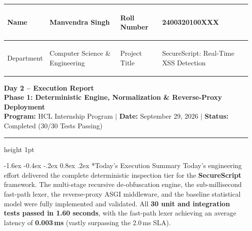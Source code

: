 \documentclass[11pt,a4paper]{article}
\makeatletter
\renewcommand{\section}{\@startsection{section}{1}{\z@}%
  {-1.6ex \@plus -0.4ex \@minus -.2ex}%
  {0.8ex \@plus .2ex}%
  {\normalfont\large\bfseries\color{primaryblue}}}
\makeatother
\begin{document}

\noindent
\begin{tabularx}{\textwidth}{|>{\bfseries\raggedright\arraybackslash}p{2.2cm}|>{\raggedright\arraybackslash}X|>{\bfseries\raggedright\arraybackslash}p{2.3cm}|>{\raggedright\arraybackslash}X|}
\hline
\rowcolor{primaryblue!10}
Name & Manvendra Singh & Roll Number & 2400320100XXX \\
\hline
\rowcolor{primaryblue!5}
Department & Computer Science \& Engineering & Project Title & SecureScript: Real-Time XSS Detection \\
\hline
\end{tabularx}

\vspace{0.8em}

\begin{center}
    {\LARGE \textbf{\color{primaryblue} Day 2 -- Execution Report}} \\[0.25em]
    {\large \textbf{Phase 1: Deterministic Engine, Normalization \& Reverse-Proxy Deployment}} \\[0.2em]
    {\footnotesize \textbf{Program:} HCL Internship Program \quad $\vert$ \quad \textbf{Date:} September 29, 2026 \quad $\vert$ \quad \textbf{Status:} Completed (30/30 Tests Passing)}
\end{center}

\vspace{0.3em}
\hrule height 1pt
\vspace{0.8em}

\section*{Today's Execution Summary}
Today's engineering effort delivered the complete deterministic inspection tier for the \textbf{SecureScript} framework. The multi-stage recursive de-obfuscation engine, the sub-millisecond fast-path lexer, the reverse-proxy ASGI middleware, and the baseline statistical model were fully implemented and validated. All \textbf{30 unit and integration tests passed in 1.60 seconds}, with the fast-path lexer achieving an average latency of \textbf{0.003\,ms} (vastly surpassing the 2.0\,ms SLA).
\end{document}
